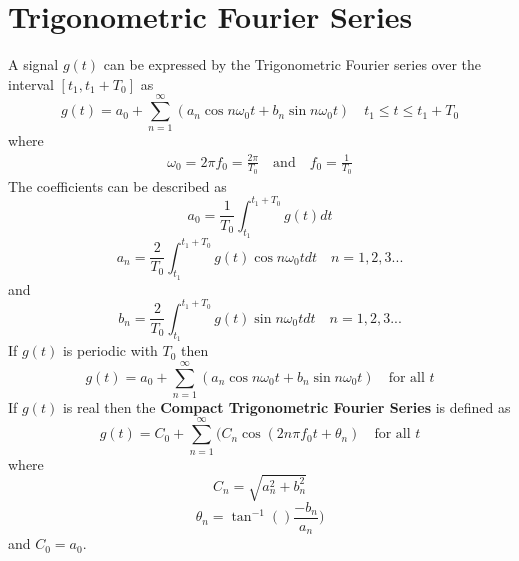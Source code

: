\documentclass{article}
\begin{document}
    \section{Trigonometric Fourier Series}
    A signal $g(t)$ can be expressed by the Trigonometric Fourier series over the interval $[t_1, t_1+T_0]$ as 
    \begin{equation}
        g(t) = a_0 + \sum_{n=1}^{\infty}(a_n \cos n \omega_0 t + b_n \sin n \omega_0 t) \quad t_1 \leq t \leq t_1+T_0
    \end{equation}
    where 
    \begin{eqnarray}
        \omega_0 = 2\pi f_0 = \frac{2\pi}{T_0} \quad \textrm{and} \quad f_0 = \frac{1}{T_0}
    \end{eqnarray}
    The coefficients can be described as
    \begin{equation}
        a_0 = \frac{1}{T_0}\int_{t_1}^{t_1+T_0} g(t)dt
    \end{equation}
    \begin{equation}
        a_n = \frac{2}{T_0}\int_{t_1}^{t_1+T_0} g(t)\cos n\omega_0tdt \quad n=1,2,3...
    \end{equation}
    and 
    \begin{equation}
        b_n = \frac{2}{T_0}\int_{t_1}^{t_1+T_0} g(t)\sin n\omega_0tdt \quad n=1,2,3...
    \end{equation}
    If $g(t)$ is periodic with $T_0$ then 
    \begin{equation}
        g(t) = a_0 + \sum_{n=1}^{\infty}(a_n \cos n \omega_0 t + b_n \sin n \omega_0 t) \quad \textrm{for all } t
    \end{equation}
    If $g(t)$ is real then the \textbf{Compact Trigonometric Fourier Series} is defined as
    \begin{equation}
        g(t) = C_0 + \sum_{n=1}^{\infty}(C_n \cos (2n\pi f_0 t + \theta_n) \quad \textrm{for all } t
    \end{equation}
    where
    \begin{equation}
        C_n = \sqrt{a_n^2 + b_n^2}
    \end{equation}
    \begin{equation}
        \theta_n = \tan^{-1}()\frac{-b_n}{a_n})
    \end{equation}
    and $C_0 = a_0$.
\end{document}
